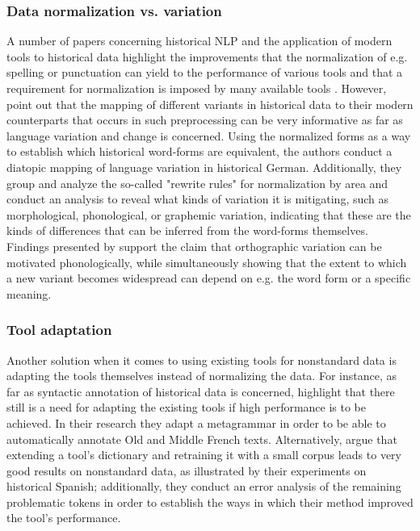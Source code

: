 \subsubsection{Data normalization vs. variation}
\label{subsubsec:normalization-var}

A number of papers concerning historical NLP and the application of modern tools to historical data highlight the improvements that the normalization of e.g. spelling or punctuation can yield to the performance of various tools and that a requirement for normalization is imposed by many available tools \citep{rayson07, scheible11, bollmann-2013-pos, hupkes16, adesam-bouma-2016-old, garrette-alpert-abrams-2016-unsupervised, estarrona-etal-2020-dealing, hamalainen-etal-2021-lemmatization}. However, \citet{dipper-waldenberger-2017-investigating} point out that the mapping of different variants in historical data to their modern counterparts that occurs in such preprocessing can be very informative as far as language variation and change is concerned. Using the normalized forms as a way to establish which historical word-forms are equivalent, the authors conduct a diatopic mapping of language variation in historical German. Additionally, they group and analyze the so-called "rewrite rules" for normalization by area and conduct an analysis to reveal what kinds of variation it is mitigating, such as morphological, phonological, or graphemic variation, indicating that these are the kinds of differences that can be inferred from the word-forms themselves. Findings presented by \citet{eisenstein_variation} support the claim that orthographic variation can be motivated phonologically, while simultaneously showing that the extent to which a new variant becomes widespread can depend on e.g. the word form or a specific meaning. 

\subsubsection{Tool adaptation}
\label{subsubsec:tool-adaptation}

Another solution when it comes to using existing tools for nonstandard data is adapting the tools themselves instead of normalizing the data. For instance, as far as syntactic annotation of historical data is concerned, \citet{regnault-etal-2019-challenges} highlight that there still is a need for adapting the existing tools if high performance is to be achieved. In their research they adapt a metagrammar in order to be able to automatically annotate Old and Middle French texts. Alternatively, \citet{sanchez-marco-etal-2011-extending} argue that extending a tool's dictionary and retraining it with a small corpus leads to very good results on nonstandard data, as illustrated by their experiments on historical Spanish; additionally, they conduct an error analysis of the remaining problematic tokens in order to establish the ways in which their method improved the tool's performance.

